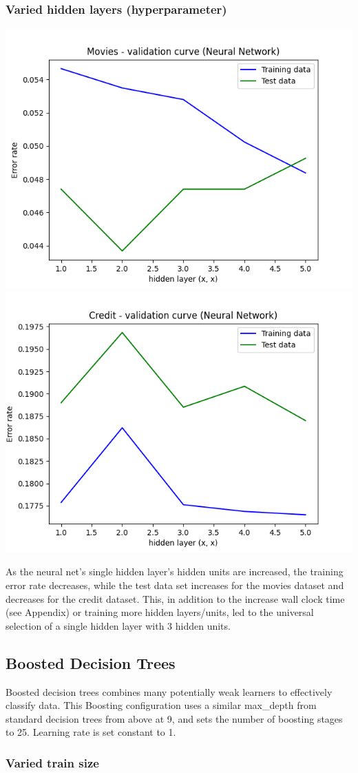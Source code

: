\documentclass{article}
\begin{document}
\subsubsection{Varied hidden layers (hyperparameter)}

\begin{center}
    \includegraphics[width=.45\linewidth]{movies-neural_net-validation_curve.png}
    \includegraphics[width=.45\linewidth]{credit-neural_net-validation_curve.png}
\end{center}

As the neural net's single hidden layer's hidden units are increased, the training error rate decreases, while the test data set increases for the movies dataset and decreases for the credit dataset. This, in addition to the increase wall clock time (see Appendix) or training more hidden layers/units, led to the universal selection of a single hidden layer with 3 hidden units.

\subsection{Boosted Decision Trees}

Boosted decision trees combines many potentially weak learners to effectively classify data. This Boosting configuration uses a similar max\_depth from standard decision trees from above at 9, and sets the number of boosting stages to 25. Learning rate is set constant to 1.
\subsubsection{Varied train size}
\end{document}
